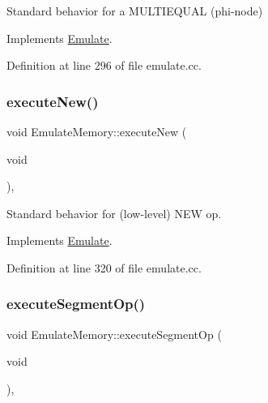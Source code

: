Standard behavior for a M\+U\+L\+T\+I\+E\+Q\+U\+AL (phi-\/node) 



Implements \mbox{\hyperlink{class_emulate_ab98cf68b6d37869f65825f3fdf03019c}{Emulate}}.



Definition at line 296 of file emulate.\+cc.

\mbox{\label{class_emulate_memory_a1d547e9376fa63d32453b437a0537043}} 
\subsubsection{\texorpdfstring{executeNew()}{executeNew()}}
{\footnotesize\ttfamily void Emulate\+Memory\+::execute\+New (\begin{DoxyParamCaption}\item[{void}]{ }\end{DoxyParamCaption})\hspace{0.3cm}{\ttfamily [protected]}, {\ttfamily [virtual]}}



Standard behavior for (low-\/level) N\+EW op. 



Implements \mbox{\hyperlink{class_emulate_ad6d1b182791e6d69b6469ea159729372}{Emulate}}.



Definition at line 320 of file emulate.\+cc.

\mbox{\label{class_emulate_memory_adeaca111cdc5c93df51a020b74528886}} 
\subsubsection{\texorpdfstring{executeSegmentOp()}{executeSegmentOp()}}
{\footnotesize\ttfamily void Emulate\+Memory\+::execute\+Segment\+Op (\begin{DoxyParamCaption}\item[{void}]{ }\end{DoxyParamCaption})\hspace{0.3cm}{\ttfamily [protected]}, {\ttfamily [virtual]}}



